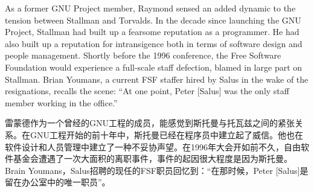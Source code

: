\ifdefined\eng
As a former GNU Project member, Raymond sensed an added dynamic to the tension between Stallman and Torvalds. In the decade since launching the GNU Project, Stallman had built up a fearsome reputation as a programmer. He had also built up a reputation for intransigence both in terms of software design and people management. Shortly before the 1996 conference, the Free Software Foundation would experience a full-scale staff defection, blamed in large part on Stallman. Brian Youmans, a current FSF staffer hired by Salus in the wake of the resignations, recalls the scene: ``At one point, Peter [Salus] was the only staff member working in the office.''
\fi

\ifdefined\chs
雷蒙德作为一个曾经的GNU工程的成员，能感觉到斯托曼与托瓦兹之间的紧张关系。在GNU工程开始的前十年中，斯托曼已经在程序员中建立起了威信。他也在软件设计和人员管理中建立了一种不妥协声望。在1996年大会开如前不久，自由软件基金会遭遇了一次大面积的离职事件，事件的起因很大程度是因为斯托曼。Brain Youmans，Salus招聘的现任的FSF职员回忆到：“在那时候，Peter [Salus]是留在办公室中的唯一职员”。
\fi








